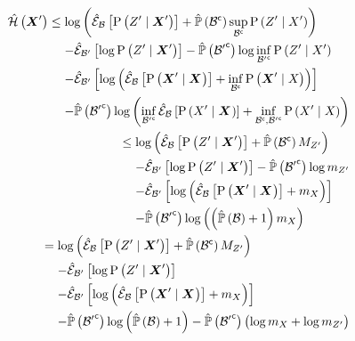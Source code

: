 \begin{proofE}
	\begin{align}
		\begin{split}
			\entropyEstimator{\statesRV{}^\prime}&\leq\log\left(\partialestimator{\probcond{\observations{}^\prime}{\statesRV{}^\prime}}{\subSpace}+\estimatedmeasure{\stcomp{\subSpace}}\sup_{\stcomp{\subSpace}}\probcond{\observations{}^\prime}{\states{}^\prime}\right)\\
			&\phantomeq-\partialestimator{\log\probcond{\observations{}^\prime}{\statesRV{}^\prime}}{\subSpace^\prime}-\estimatedmeasure{\stcomp{\subSpace^\prime}}\log\inf_{\stcomp{\subSpace^\prime}}\probcond{\observations{}^\prime}{\states{}^\prime}\\
			&\phantomeq-\partialestimator{\log\left(\partialestimator{\probcond{\statesRV{}^\prime}{\statesRV{}}}{\subSpace}+\inf_{\stcomp{\subSpace}}\probcond{\statesRV{}^\prime}{\states{}}\right)}{\subSpace^\prime}\\
			&\phantomeq-\estimatedmeasure{\stcomp{\subSpace^\prime}}\log\left(\inf_{\stcomp{\subSpace^\prime}}\partialestimator{\probcond{\states{}^\prime}{\statesRV{}}}{\subSpace}+\inf_{\stcomp{\subSpace},\stcomp{\subSpace^\prime}}\probcond{\states{}^\prime}{\states{}}\right)
		\end{split}\\
		\begin{split}
			&\leq\log\left(\partialestimator{\probcond{\observations{}^\prime}{\statesRV{}^\prime}}{\subSpace}+\estimatedmeasure{\stcomp{\subSpace}}M_{\observations{}^\prime}\right)\\
			&\phantomeq-\partialestimator{\log\probcond{\observations{}^\prime}{\statesRV{}^\prime}}{\subSpace^\prime}-\estimatedmeasure{\stcomp{\subSpace^\prime}}\log m_{\observations{}^\prime}\\
			&\phantomeq-\partialestimator{\log\left(\partialestimator{\probcond{\statesRV{}^\prime}{\statesRV{}}}{\subSpace}+m_{\states{}}\right)}{\subSpace^\prime}\\
			&\phantomeq-\estimatedmeasure{\stcomp{\subSpace^\prime}}\log\left(\left(\estimatedmeasure{\subSpace}+1\right)m_{\states{}}\right)
		\end{split}\\
		\begin{split}
			&=\log\left(\partialestimator{\probcond{\observations{}^\prime}{\statesRV{}^\prime}}{\subSpace}+\estimatedmeasure{\stcomp{\subSpace}}M_{\observations{}^\prime}\right)\\
			&\phantomeq-\partialestimator{\log\probcond{\observations{}^\prime}{\statesRV{}^\prime}}{\subSpace^\prime}\\
			&\phantomeq-\partialestimator{\log\left(\partialestimator{\probcond{\statesRV{}^\prime}{\statesRV{}}}{\subSpace}+m_{\states{}}\right)}{\subSpace^\prime}\\
			&\phantomeq-\estimatedmeasure{\stcomp{\subSpace^\prime}}\log\left(\estimatedmeasure{\subSpace}+1\right) -\estimatedmeasure{\stcomp{\subSpace^\prime}}\left(\log m_{\states{}}+\log m_{\observations{}^\prime}\right)
		\end{split}
	\end{align}
\end{proofE}

